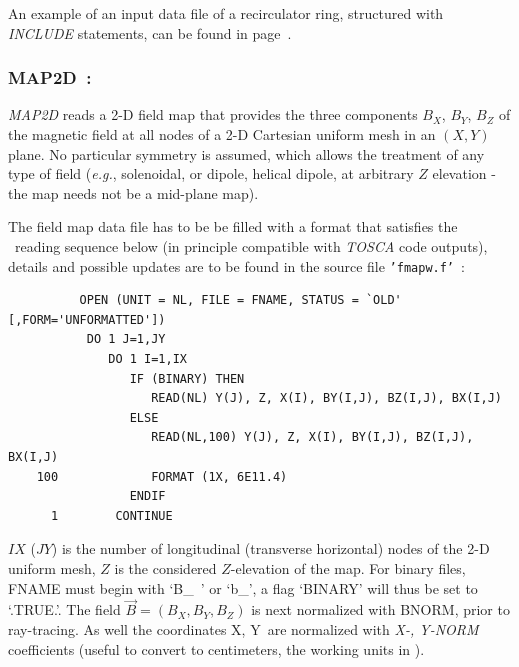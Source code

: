 {\medskip

\noindent An example of an input data file of a recirculator ring, structured with \textsl{INCLUDE} statements, 
can be found in page~\pageref{ExaINCLUDE-GOTO}. 





\newpage

\subsubsection*{MAP2D~: \MAPTwoDTitl~\cite{Pavel}} \label{MAP2D} 
\medskip

\textsl{MAP2D} reads a 2-D field map that provides the three
components $ B_X$, $ B_Y $, $ B_Z $ of the magnetic field at all nodes of a 2-D Cartesian 
uniform mesh in an $(X,Y)$ plane. 
No particular symmetry is assumed, which allows the 
treatment of any type of field (\emph{e.g.}, solenoidal, or dipole,  
helical dipole, at  arbitrary $Z$ elevation 
- the map needs not be a mid-plane map). 

\medskip

\noindent The field map data file has to be be filled with a 
format that satisfies the  \FORTRAN\ reading sequence below (in principle compatible 
with \textsl{TOSCA} code outputs), details and possible updates are to be found in the source  
file \texttt{'fmapw.f'}~:  

{\footnotesize
\begin{verbatim}
	      OPEN (UNIT = NL, FILE = FNAME, STATUS = `OLD' [,FORM='UNFORMATTED'])
	       DO 1 J=1,JY 
	          DO 1 I=1,IX
	             IF (BINARY) THEN
	                READ(NL) Y(J), Z, X(I), BY(I,J), BZ(I,J), BX(I,J)
	             ELSE
	                READ(NL,100) Y(J), Z, X(I), BY(I,J), BZ(I,J), BX(I,J)
	100             FORMAT (1X, 6E11.4)
	             ENDIF
      1        CONTINUE
\end{verbatim}}
\medskip

\noindent $IX$ ($JY$) is the number of longitudinal (transverse horizontal) nodes of 
the 2-D uniform mesh, $Z $ is the considered $Z$-elevation of the map. For 
binary files, FNAME must begin with \mbox{`B\_ '} or  \mbox{`b\_'}, a flag `BINARY' will thus be 
set to `.TRUE.'. The field $ \vec  B=(B_X,B_Y,B_Z )$ is next normalized with 
BNORM, prior to ray-tracing.  As well the  coordinates  X, Y~are normalized with 
  \textsl{X-, Y-NORM} coefficients (useful to convert to centimeters, the working units in  \zgoubi). 


}
